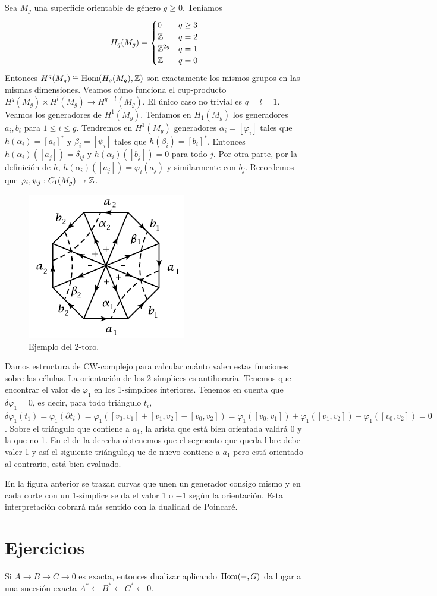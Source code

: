 \documentclass[TA.tex]{subfiles}
\begin{document}
\begin{ej}
Sea $M_g$ una superficie orientable de género $g\geq 0$. Teníamos $$H_q(M_g)=\begin{cases}
0 & q\geq 3\\
\mathbb{Z} & q=2\\
\mathbb{Z}^{2g} & q=1\\
\mathbb{Z} & q=0
\end{cases}$$
Entonces $H^q(M_g)\cong \operatorname{Hom}(H_q(M_g),\mathbb{Z})$ son exactamente los mismos grupos en las mismas dimensiones. Veamos cómo funciona el cup-producto $H^q(M_g)\times H^l(M_g)\to H^{q+l}(M_g)$. El único caso no trivial es $q=l=1$. Veamos los generadores de $H^1(M_g)$. Teníamos en $H_1(M_g)$ los generadores $a_i,b_i$ para $1\leq i\leq g$. Tendremos en $H^1(M_g)$ generadores $\alpha_i=[\varphi_i]$ tales que $h(\alpha_i)=[a_i]^*$ y $\beta_i=[\psi_i]$ tales que $h(\beta_i)=[b_i]^*$. Entonces $h(\alpha_i)([a_j])=\delta_{ij}$ y $h(\alpha_i)([b_j])=0$ para todo $j$. Por otra parte, por la definición de $h$, $h(\alpha_i)([a_j])=\varphi_i(a_j)$ y similarmente con $b_j$. Recordemos que $\varphi_i,\psi_j:C_1(M_g)\to \mathbb{Z}$. 

\begin{figure}[h!]
\includegraphics[scale=0.7]{cup}
\caption{Ejemplo del 2-toro.}
\end{figure}

Damos estructura de CW-complejo para calcular cuánto valen estas funciones sobre las células. La orientación de los 2-símplices es antihoraria. Tenemos que encontrar el valor de $\varphi_1$ en los 1-símplices interiores. Tenemos en cuenta que $\delta\varphi_1=0$, es decir, para todo triángulo $t_i$, $\delta\varphi_1(t_1)=\varphi_1(\partial t_i)=\varphi_1([v_0,v_1]+[v_1,v_2]-[v_0,v_2])=\varphi_1([v_0,v_1])+\varphi_1([v_1,v_2])-\varphi_1([v_0,v_2])=0$. Sobre el triángulo que contiene a $a_1$, la arista que está bien orientada valdrá 0 y la que no 1. En el de la derecha obtenemos que el segmento que queda libre debe valer 1 y así el siguiente triángulo,q ue de nuevo contiene a $a_1$ pero está orientado al contrario, está bien evaluado. 

En la figura anterior se trazan curvas que unen un generador consigo mismo y en cada corte con un 1-símplice se da el valor 1 o $-1$ según la orientación. Esta interpretación cobrará más sentido con la dualidad de Poincaré. 

\end{ej}



\section{Ejercicios}
\begin{ejer}
Si $A\to B\to C\to 0$ es exacta, entonces dualizar aplicando $\operatorname{Hom}(-,G)$ da lugar a una sucesión exacta $A^*\leftarrow B^*\leftarrow C^*\leftarrow 0$.
\end{ejer}
\end{document}
